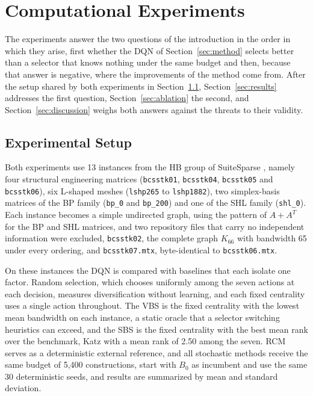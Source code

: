 \documentclass[runningheads]{llncs}
\begin{document}
\section{Computational Experiments}
\label{sec:experiments}

The experiments answer the two questions of the introduction in the order in which they arise, first whether the DQN of Section~\ref{sec:method} selects better than a selector that knows nothing under the same budget and then, because that answer is negative, where the improvements of the method come from. After the setup shared by both experiments in Section~\ref{sec:setup}, Section~\ref{sec:results} addresses the first question, Section~\ref{sec:ablation} the second, and Section~\ref{sec:discussion} weighs both answers against the threats to their validity.

\subsection{Experimental Setup}
\label{sec:setup}

Both experiments use 13 instances from the HB group of SuiteSparse \cite{davis2011,duff1989}, namely four structural engineering matrices (\texttt{bcsstk01}, \texttt{bcsstk04}, \texttt{bcsstk05} and \texttt{bcsstk06}), six L-shaped meshes (\texttt{lshp265} to \texttt{lshp1882}), two simplex-basis matrices of the BP family (\texttt{bp\_0} and \texttt{bp\_200}) and one of the SHL family (\texttt{shl\_0}). Each instance becomes a simple undirected graph, using the pattern of $A+A^{T}$ for the BP and SHL matrices, and two repository files that carry no independent information were excluded, \texttt{bcsstk02}, the complete graph $K_{66}$ with bandwidth 65 under every ordering, and \texttt{bcsstk07.mtx}, byte-identical to \texttt{bcsstk06.mtx}.

On these instances the DQN is compared with baselines that each isolate one factor. Random selection, which chooses uniformly among the seven actions at each decision, measures diversification without learning, and each fixed centrality uses a single action throughout. The VBS is the fixed centrality with the lowest mean bandwidth on each instance, a static oracle that a selector switching heuristics can exceed, and the SBS is the fixed centrality with the best mean rank over the benchmark, Katz with a mean rank of 2.50 among the seven. RCM serves as a deterministic external reference, and all stochastic methods receive the same budget of 5,400 constructions, start with $B_0$ as incumbent and use the same 30 deterministic seeds, and results are summarized by mean and standard deviation.
\end{document}
